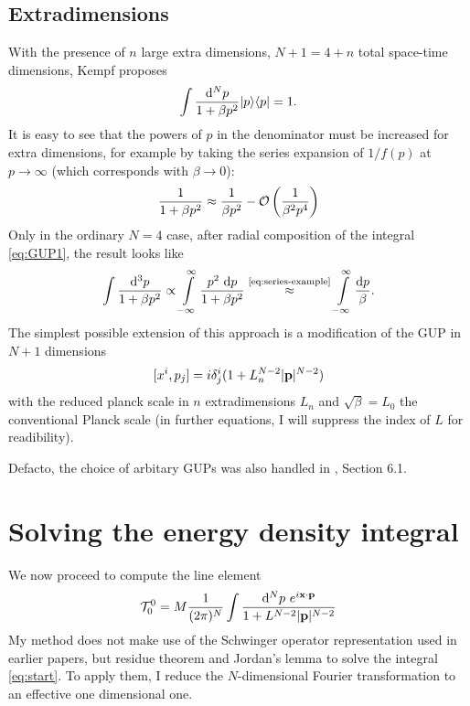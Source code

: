 \documentclass[10pt,a4paper]{article}
\begin{document}
\subsection{Extradimensions}
With the presence of $n$ large extra dimensions, $N+1 = 4+n$ total space-time dimensions, Kempf proposes \cite{kempf1995}
%
\begin{equation}
\int \frac{\mathrm{d}^N p}{1 + \beta p^2} |p\rangle\langle p| = 1.
\end{equation}
%
It is easy to see that the powers of $p$ in the denominator must be increased for extra dimensions, for example by taking the series expansion of $1/f(p)$ at $p\to\infty$ (which corresponds with $\beta \to 0$):
%
\begin{equation} \label{eq:series-example}
\frac{1}{1 + \beta p^2} \approx \frac{1}{\beta p^2} 
- {\cal O}\left( \frac{1}{\beta^2 p^4} \right)
\end{equation}
%
Only in the ordinary $N=4$ case, after radial composition of the integral \eqref{eq:GUP1}, the result looks like
\begin{equation}
\int \frac{ \mathrm{d}^3 p }{ 1 + \beta p^2}
\propto
\int \limits_{-\infty}^{\infty} \frac{ p^2~\mathrm{d} p }{ 1 + \beta p^2}
\stackrel{\text{\eqref{eq:series-example}}}{\approx}
\int \limits_{-\infty}^{\infty} \frac{\mathrm{d} p}{\beta}.
\end{equation}
%
The simplest possible extension of this approach is a modification of the GUP in $N+1$ dimensions
\begin{equation} \label{eq:improvedGUP}
[x^i, p_j] = i \delta^i_j (1 + L_n^{N-2} |\mathbf{ p }|^{N-2})
\end{equation}
with the reduced planck scale in $n$ extradimensions $L_n$ and $\sqrt{\beta} = L_0$ the conventional Planck scale (in further equations, I will suppress the index of $L$ for readibility).

Defacto, the choice of arbitary GUPs was also handled in \cite{kempf1995}, Section 6.1. 

\section{Solving the energy density integral} \label{sec:content}
We now proceed to compute the line element
%
\begin{equation} \label{eq:start}
{\cal T}_0^0 = M \frac{1}{(2\pi)^N} \int
\frac{\mathrm{d}^N p ~ e^{i \mathbf{ x } \cdot \mathbf{ p }}}{1 + L^{N-2} |\mathbf{ p }|^{N-2}}
\end{equation}
%
My method does not make use of the Schwinger operator representation used in earlier papers, but residue theorem and Jordan's lemma to solve the integral \eqref{eq:start}. To apply them, I reduce the $N$-dimensional Fourier transformation to an effective one dimensional one.
\end{document}
